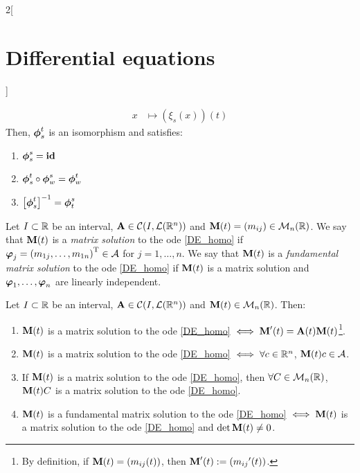 \documentclass[../../../main.tex]{subfiles}
\begin{document}
\begin{multicols}{2}[\section{Differential equations}]
\begin{corollary}
\begin{align*}
      x                               & \longmapsto(\xi_s(x))(t)
    \end{align*}
    Then, $\boldsymbol{\mathrm{\phi}}_s^t$ is an isomorphism and satisfies:
    \begin{enumerate}
      \item $\boldsymbol{\mathrm{\phi}}_s^s=\boldsymbol{\mathrm{\mathrm{id}}}$
      \item $\boldsymbol{\mathrm{\phi}}_s^t\circ\boldsymbol{\mathrm{\phi}}_w^s=\boldsymbol{\mathrm{\phi}}_w^t$
      \item ${\left[\boldsymbol{\mathrm{\phi}}_s^t\right]}^{-1}=\boldsymbol{\mathrm{\phi}}_t^s$
    \end{enumerate}
  \end{corollary}
  \begin{definition}
    Let $I\subset \mathbb{R}$ be an interval, $\boldsymbol{\mathrm{A}}\in\mathcal{C}(I,\mathcal{L}(\mathbb{R}^n))$ and $\boldsymbol{\mathrm{M}}(t)=(m_{ij})\in\mathcal{M}_n(\mathbb{R})$. We say that $\boldsymbol{\mathrm{M}}(t)$ is a \textit{matrix solution} to the ode \eqref{DE_homo} if $\boldsymbol{\mathrm{\varphi}}_j={(m_{1j},\ldots,m_{1n})}^\mathrm{T}\in\mathcal{A}$ for $j=1,\ldots,n$. We say that $\boldsymbol{\mathrm{M}}(t)$ is a \textit{fundamental matrix solution} to the ode \eqref{DE_homo} if $\boldsymbol{\mathrm{M}}(t)$ is a matrix solution and $\boldsymbol{\mathrm{\varphi}}_1,\ldots,\boldsymbol{\mathrm{\varphi}}_n$ are linearly independent.
  \end{definition}
  \begin{prop}
    Let $I\subset \mathbb{R}$ be an interval, $\boldsymbol{\mathrm{A}}\in\mathcal{C}(I,\mathcal{L}(\mathbb{R}^n))$ and $\boldsymbol{\mathrm{M}}(t)\in\mathcal{M}_n(\mathbb{R})$. Then:
    \begin{enumerate}
      \item $\boldsymbol{\mathrm{M}}(t)$ is a matrix solution to the ode \eqref{DE_homo} $\iff\boldsymbol{\mathrm{M}}'(t)=\boldsymbol{\mathrm{A}}(t)\boldsymbol{\mathrm{M}}(t)$\footnote{By definition, if $\boldsymbol{\mathrm{M}}(t)=(m_{ij}(t))$, then $\boldsymbol{\mathrm{M}}'(t):=({m_{ij}}'(t))$.}.
      \item $\boldsymbol{\mathrm{M}}(t)$ is a matrix solution to the ode \eqref{DE_homo} $\iff\forall c\in\mathbb{R}^n$, $\boldsymbol{\mathrm{M}}(t)c\in\mathcal{A}$.
      \item If $\boldsymbol{\mathrm{M}}(t)$ is a matrix solution to the ode \eqref{DE_homo}, then $\forall C\in\mathcal{M}_n(\mathbb{R})$, $\boldsymbol{\mathrm{M}}(t)C$ is a matrix solution to the ode \eqref{DE_homo}.
      \item $\boldsymbol{\mathrm{M}}(t)$ is a fundamental matrix solution to the ode \eqref{DE_homo} $\iff\boldsymbol{\mathrm{M}}(t)$ is a matrix solution to the ode \eqref{DE_homo} and $\det\boldsymbol{\mathrm{M}}(t)\ne 0$.

\end{enumerate}
\end{prop}
\end{multicols}
\end{document}
